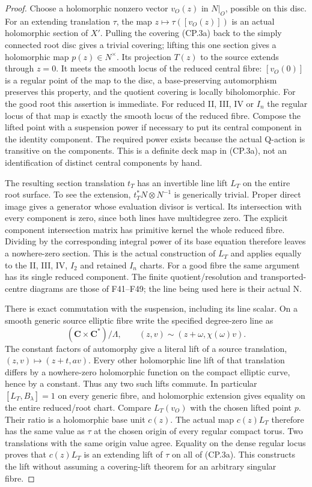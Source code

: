 \begin{proof}
Choose a holomorphic nonzero vector \(v_O(z)\) in \(N|_O\), possible
on this disc. For an extending translation \(\tau\), the map
\(z\mapsto\tau([v_O(z)])\) is an actual holomorphic section of
\(X'\). Pulling the covering (CP.3a) back to the simply connected
root disc gives a trivial covering; lifting this one section gives
a holomorphic map \(p(z)\in N^\times\). Its projection \(T(z)\)
to the source extends through \(z=0\). It meets the smooth locus
of the reduced central fibre: \([v_O(0)]\) is a regular point of
the map to the disc, a base-preserving automorphism preserves this
property, and the quotient covering is locally biholomorphic. For
the good root this assertion is immediate. For reduced II, III,
IV or \(I_n\) the regular locus of that map is exactly the smooth locus
of the reduced fibre. Compose the lifted point with a suspension
power if necessary to put its central component in the identity
component. The required power exists because the actual Q-action
is transitive on the components. This is a definite deck map in
(CP.3a), not an identification of distinct central components by hand.

The resulting section translation \(t_T\) has an invertible line
lift \(L_T\) on the entire root surface. To see the extension,
\(t_T^*N\otimes N^{-1}\) is generically trivial. Proper direct
image gives a generator whose evaluation divisor is vertical. Its
intersection with every component is zero, since both lines have
multidegree zero. The explicit component intersection matrix has
primitive kernel the whole reduced fibre. Dividing by the
corresponding integral power of its base equation therefore leaves
a nowhere-zero section. This is the actual construction of \(L_T\)
and applies equally to the II, III, IV, \(I_2\) and retained \(I_n\) charts.
For a good fibre the same argument has its single reduced component.
The finite quotient/resolution and transported-centre diagrams are
those of F41--F49; the line being used here is their actual N.

There is exact commutation with the suspension, including its line
scalar. On a smooth generic source elliptic fibre write the
specified degree-zero line as
\[
 (\mathbf C\times\mathbf C^*)/\Lambda,\qquad
 (z,v)\sim(z+\omega,\chi(\omega)v).
\]
The constant factors of automorphy give a literal lift of a source
translation, \((z,v)\mapsto(z+t,av)\). Every other holomorphic
line lift of that translation differs by a nowhere-zero holomorphic
function on the compact elliptic curve, hence by a constant. Thus
any two such lifts commute. In particular \([L_T,B_\lambda]=1\)
on every generic fibre, and holomorphic extension gives equality
on the entire reduced/root chart. Compare \(L_T(v_O)\) with the
chosen lifted point \(p\). Their ratio is a holomorphic base unit
\(c(z)\). The actual map \(c(z)L_T\) therefore has the same value
as \(\tau\) at the chosen origin of every regular compact torus.
Two translations with the same origin value agree. Equality on the
dense regular locus proves that \(c(z)L_T\) is an extending lift of
\(\tau\) on all of (CP.3a). This constructs the lift without
assuming a covering-lift theorem for an arbitrary singular fibre.


\end{proof}
